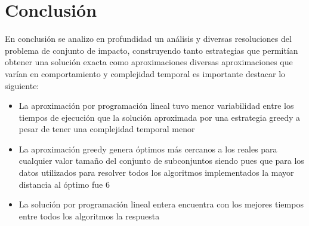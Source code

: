 \section{Conclusión}

En conclusión se analizo en profundidad un análisis y diversas resoluciones del problema de conjunto de impacto, construyendo tanto estrategias que permitían obtener una solución exacta como aproximaciones diversas aproximaciones que varían en comportamiento y complejidad temporal es importante destacar lo siguiente:

\begin{itemize}
    \item La aproximación por programación lineal tuvo menor variabilidad entre los tiempos de ejecución que la solución aproximada por una estrategia greedy a pesar de tener una complejidad temporal menor\\
    \item La aproximación greedy genera óptimos más cercanos a los reales para cualquier valor tamaño del conjunto de subconjuntos siendo pues que para los datos utilizados para resolver todos los algoritmos implementados la mayor distancia al óptimo fue 6 \\
    \item La solución por programación lineal entera encuentra con los mejores tiempos entre todos los algoritmos la respuesta \\ 
\end{itemize}